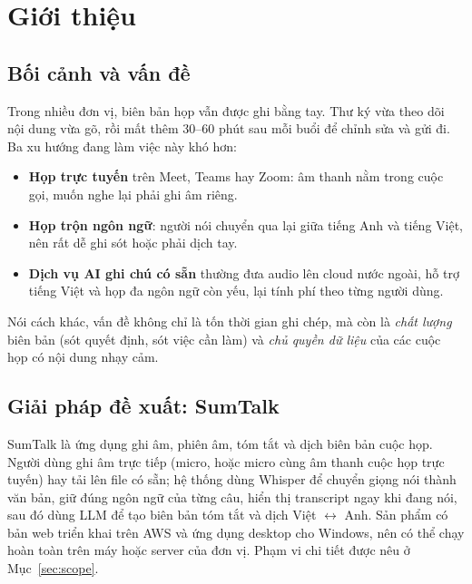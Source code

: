 \documentclass[12pt,a4paper]{report}
\begin{document}
\cleardoublepage{}
{}
\listoftables

\chapter{Giới thiệu}
\label{chap:intro}

\section{Bối cảnh và vấn đề}

Trong nhiều đơn vị, biên bản họp vẫn được ghi bằng tay. Thư ký vừa theo dõi nội dung vừa gõ, rồi mất thêm
30--60 phút sau mỗi buổi để chỉnh sửa và gửi đi. Ba xu hướng đang làm việc này khó hơn:
\begin{itemize}
  \item \textbf{Họp trực tuyến} trên Meet, Teams hay Zoom: âm thanh nằm trong cuộc gọi, muốn nghe lại phải ghi
        âm riêng.
  \item \textbf{Họp trộn ngôn ngữ}: người nói chuyển qua lại giữa tiếng Anh và tiếng Việt, nên rất dễ ghi sót
        hoặc phải dịch tay.
  \item \textbf{Dịch vụ AI ghi chú có sẵn} thường đưa audio lên cloud nước ngoài, hỗ trợ tiếng Việt và họp đa
        ngôn ngữ còn yếu, lại tính phí theo từng người dùng.
\end{itemize}
Nói cách khác, vấn đề không chỉ là tốn thời gian ghi chép, mà còn là \emph{chất lượng} biên bản (sót quyết định,
sót việc cần làm) và \emph{chủ quyền dữ liệu} của các cuộc họp có nội dung nhạy cảm.

\section{Giải pháp đề xuất: SumTalk}

SumTalk là ứng dụng ghi âm, phiên âm, tóm tắt và dịch biên bản cuộc họp. Người dùng ghi âm trực tiếp (micro,
hoặc micro cùng âm thanh cuộc họp trực tuyến) hay tải lên file có sẵn; hệ thống dùng Whisper để chuyển giọng
nói thành văn bản, giữ đúng ngôn ngữ của từng câu, hiển thị transcript ngay khi đang nói, sau đó dùng LLM để
tạo biên bản tóm tắt và dịch Việt $\leftrightarrow$ Anh. Sản phẩm có bản web triển khai trên AWS và ứng dụng
desktop cho Windows, nên có thể chạy hoàn toàn trên máy hoặc server của đơn vị. Phạm vi chi tiết được nêu ở
Mục~\ref{sec:scope}.
\end{document}
